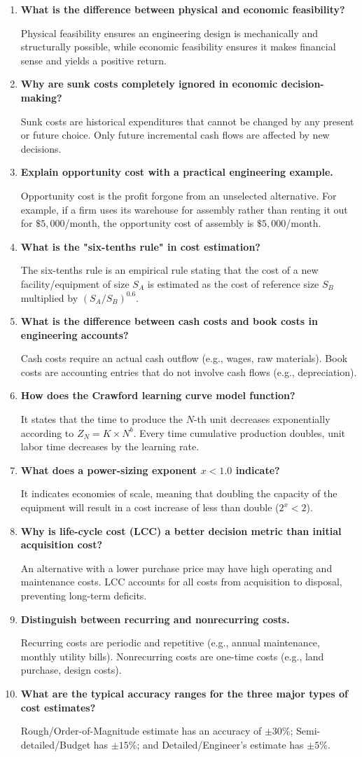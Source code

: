 \documentclass[12pt,a4paper]{article}
\newcommand{\Q}[1]{\textbf{#1}\par\noindent\ignorespaces}
\begin{document}
\begin{tcolorbox}[exambox, title={\textbf{Frequently Asked / Viva Questions}}]
\begin{enumerate}[topsep=0pt, label=\textbf{Q\arabic*.}, itemsep=5pt]
  \item \Q{What is the difference between physical and economic feasibility?}
    Physical feasibility ensures an engineering design is mechanically and structurally possible, while economic feasibility ensures it makes financial sense and yields a positive return.
  \item \Q{Why are sunk costs completely ignored in economic decision-making?}
    Sunk costs are historical expenditures that cannot be changed by any present or future choice. Only future incremental cash flows are affected by new decisions.
  \item \Q{Explain opportunity cost with a practical engineering example.}
    Opportunity cost is the profit forgone from an unselected alternative. For example, if a firm uses its warehouse for assembly rather than renting it out for $\$5,000$/month, the opportunity cost of assembly is $\$5,000$/month.
  \item \Q{What is the "six-tenths rule" in cost estimation?}
    The six-tenths rule is an empirical rule stating that the cost of a new facility/equipment of size $S_A$ is estimated as the cost of reference size $S_B$ multiplied by $(S_A/S_B)^{0.6}$.
  \item \Q{What is the difference between cash costs and book costs in engineering accounts?}
    Cash costs require an actual cash outflow (e.g., wages, raw materials). Book costs are accounting entries that do not involve cash flows (e.g., depreciation).
  \item \Q{How does the Crawford learning curve model function?}
    It states that the time to produce the $N$-th unit decreases exponentially according to $Z_N = K \times N^b$. Every time cumulative production doubles, unit labor time decreases by the learning rate.
  \item \Q{What does a power-sizing exponent $x < 1.0$ indicate?}
    It indicates economies of scale, meaning that doubling the capacity of the equipment will result in a cost increase of less than double ($2^x < 2$).
  \item \Q{Why is life-cycle cost (LCC) a better decision metric than initial acquisition cost?}
    An alternative with a lower purchase price may have high operating and maintenance costs. LCC accounts for all costs from acquisition to disposal, preventing long-term deficits.
  \item \Q{Distinguish between recurring and nonrecurring costs.}
    Recurring costs are periodic and repetitive (e.g., annual maintenance, monthly utility bills). Nonrecurring costs are one-time costs (e.g., land purchase, design costs).
  \item \Q{What are the typical accuracy ranges for the three major types of cost estimates?}
    Rough/Order-of-Magnitude estimate has an accuracy of $\pm 30\%$; Semi-detailed/Budget has $\pm 15\%$; and Detailed/Engineer's estimate has $\pm 5\%$.


\end{enumerate}
\end{tcolorbox}
\end{document}
